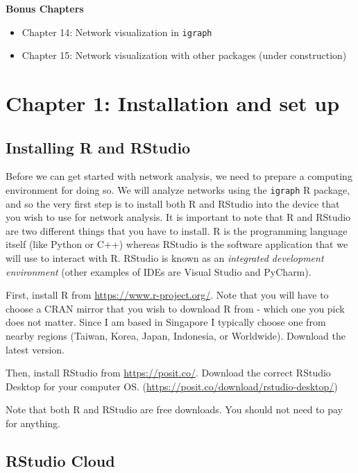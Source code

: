 \documentclass[
]{book}
\providecommand{\tightlist}{%
  \setlength{\itemsep}{0pt}\setlength{\parskip}{0pt}}
\begin{document}
\textbf{Bonus Chapters}

\begin{itemize}
\tightlist
\item
  Chapter 14: Network visualization in \texttt{igraph}
\item
  Chapter 15: Network visualization with other packages (under construction)
\end{itemize}

\chapter{Chapter 1: Installation and set up}\label{ch1}

\section{Installing R and RStudio}\label{installing-r-and-rstudio}

Before we can get started with network analysis, we need to prepare a computing environment for doing so. We will analyze networks using the \texttt{igraph} R package, and so the very first step is to install both R and RStudio into the device that you wish to use for network analysis. It is important to note that R and RStudio are two different things that you have to install. R is the programming language itself (like Python or C++) whereas RStudio is the software application that we will use to interact with R. RStudio is known as an \emph{integrated development environment} (other examples of IDEs are Visual Studio and PyCharm).

First, install R from \url{https://www.r-project.org/}. Note that you will have to choose a CRAN mirror that you wish to download R from - which one you pick does not matter. Since I am based in Singapore I typically choose one from nearby regions (Taiwan, Korea, Japan, Indonesia, or Worldwide). Download the latest version.

Then, install RStudio from \url{https://posit.co/}. Download the correct RStudio Desktop for your computer OS. (\url{https://posit.co/download/rstudio-desktop/})

Note that both R and RStudio are free downloads. You should not need to pay for anything.

\section{RStudio Cloud}\label{rstudio-cloud}
\end{document}

